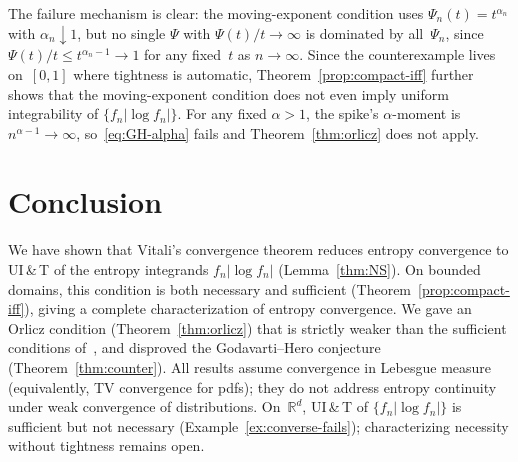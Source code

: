 \documentclass[journal]{IEEEtran}
\theoremstyle{definition}
\theoremstyle{remark}
\newcommand{\Rd}{\mathbb{R}^d}
\newcommand{\1}{\mathbf{1}}
\newcommand{\abs}[1]{\lvert #1 \rvert}
\begin{document}
The failure mechanism is clear: the moving-exponent condition uses
$\Psi_n(t) = t^{\alpha_n}$ with $\alpha_n \downarrow 1$, but no
single $\Psi$ with $\Psi(t)/t \to \infty$ is dominated by
all~$\Psi_n$, since $\Psi(t)/t \leq t^{\alpha_n - 1} \to 1$ for
any fixed~$t$ as $n \to \infty$.
Since the counterexample lives on~$[0,1]$ where tightness is
automatic, Theorem~\ref{prop:compact-iff} further shows that the
moving-exponent condition does not even imply uniform integrability
of $\{f_n \abs{\log f_n}\}$.
For any fixed $\alpha > 1$, the spike's $\alpha$-moment is
$n^{\alpha - 1} \to \infty$, so~\eqref{eq:GH-alpha} fails
and Theorem~\ref{thm:orlicz} does not apply.

\section{Conclusion}\label{sec:conclusion}

We have shown that Vitali's convergence theorem reduces entropy
convergence to UI\,\&\,T of the entropy integrands
$f_n \abs{\log f_n}$ (Lemma~\ref{thm:NS}).  On bounded domains,
this condition is both necessary and sufficient
(Theorem~\ref{prop:compact-iff}), giving a complete
characterization of entropy convergence.  We gave an
Orlicz condition (Theorem~\ref{thm:orlicz}) that is strictly weaker
than the sufficient conditions
of~\cite{GodavartiHero2004, PieraParada2009,
GhourchianGohariAmini2017}, and disproved the Godavarti--Hero
conjecture (Theorem~\ref{thm:counter}).  All results assume
convergence in Lebesgue measure (equivalently, TV convergence for
pdfs); they do not address entropy continuity under weak
convergence of distributions.
On~$\Rd$, UI\,\&\,T of $\{f_n\abs{\log f_n}\}$ is sufficient but
not necessary (Example~\ref{ex:converse-fails}); characterizing
necessity without tightness remains open.



\end{document}
